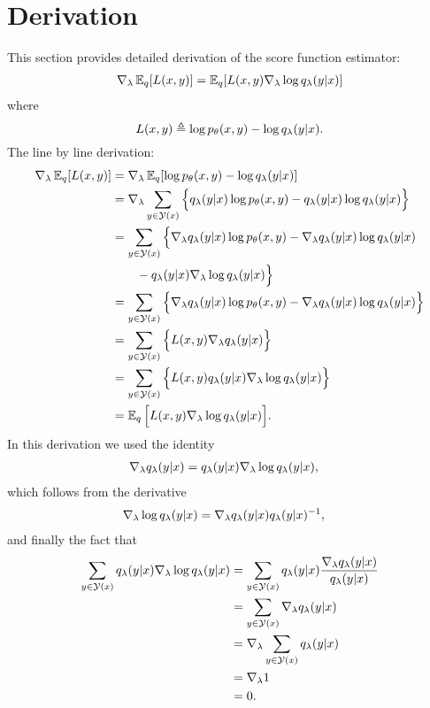 \section{Derivation}
This section provides detailed derivation of the score function estimator:
\begin{align}
  \label{eq:score-function-estimator}
  \nabla_{\lambda} \operatorname{\mathbb{E}}_{q} [ L(x, y) ] = \operatorname{\mathbb{E}}_{q} [ L(x, y) \nabla_{\lambda} \log q_{\lambda}(y | x) ]
\end{align}
where
\begin{equation*}
  L(x, y) \triangleq \log p_{\theta}(x, y) - \log q_{\lambda}(y | x).
\end{equation*}
The line by line derivation:
\begin{align*}
  \nabla_{\lambda} \operatorname{\mathbb{E}}_{q} [ L(x, y) ] &=
  \nabla_{\lambda} \operatorname{\mathbb{E}}_{q} [ \log p_{\theta}(x, y) - \log q_{\lambda}(y | x) ] \\
    &= \nabla_{\lambda} \sum_{y \in \mathcal{Y}(x)} \Big\{ q_{\lambda}(y | x) \log p_{\theta}(x, y) - q_{\lambda}(y | x)\log q_{\lambda}(y | x) \Big\} \\
    &= \sum_{y \in \mathcal{Y}(x)} \Big\{ \nabla_{\lambda} q_{\lambda}(y | x) \log p_{\theta}(x, y)  - \nabla_{\lambda} q_{\lambda}(y | x)\log q_{\lambda}(y | x) \\
    &\qquad -  q_{\lambda}(y | x)\nabla_{\lambda}\log q_{\lambda}(y | x) \Big\} \\
    &= \sum_{y \in \mathcal{Y}(x)} \Big\{ \nabla_{\lambda} q_{\lambda}(y | x) \log p_{\theta}(x, y) - \nabla_{\lambda} q_{\lambda}(y | x)\log q_{\lambda}(y | x) \Big\} \\
    &= \sum_{y \in \mathcal{Y}(x)} \Big\{ L(x, y)\nabla_{\lambda} q_{\lambda}(y | x) \Big\} \\
    &= \sum_{y \in \mathcal{Y}(x)} \Big\{ L(x, y) q_{\lambda}(y | x) \nabla_{\lambda} \log q_{\lambda}(y | x) \Big\}   \\
    &= \operatorname{\mathbb{E}}_{q} \Big[ L(x, y) \nabla_{\lambda} \log q_{\lambda}(y | x) \Big].
\end{align*}
In this derivation we used the identity
\begin{align*}
  \nabla_{\lambda} q_{\lambda}(y | x) &= q_{\lambda}(y | x)\nabla_{\lambda}\log q_{\lambda}(y | x),
\end{align*}
which follows from the derivative
\begin{align*}
  \nabla_{\lambda}\log q_{\lambda}(y | x) &= \nabla_{\lambda} q_{\lambda}(y | x)q_{\lambda}(y | x)^{-1},
\end{align*}
and finally the fact that
\begin{align*}
  \sum_{y \in \mathcal{Y}(x)} q_{\lambda}(y | x)\nabla_{\lambda}\log q_{\lambda}(y | x)
    &= \sum_{y \in \mathcal{Y}(x)}  q_{\lambda}(y | x) \frac{\nabla_{\lambda} q_{\lambda}(y | x)}{q_{\lambda}(y | x)}  \\
    &= \sum_{y \in \mathcal{Y}(x)} \nabla_{\lambda} q_{\lambda}(y | x) \\
    &= \nabla_{\lambda} \sum_{y \in \mathcal{Y}(x)} q_{\lambda}(y | x)\\
    &= \nabla_{\lambda} 1 \\
    &= 0. \\
\end{align*}


